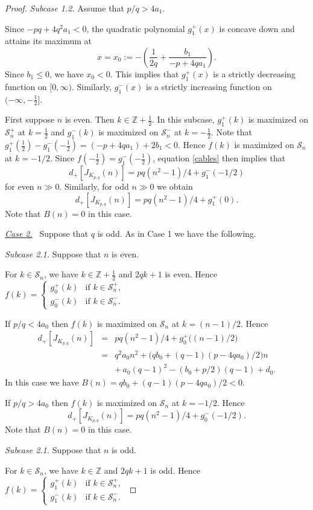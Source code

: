 \documentclass[11pt]{amsart}
\theoremstyle{definition}
\def\BZ{\mathbb Z}
\def\CS{\mathcal S}
\begin{document}
\begin{proof}
\textit{Subcase 1.2.} 
Assume that $p/q >4a_1$. 

Since $-pq + 4q^2 a_1<0$, the quadratic polynomial $g_1^+(x)$ is concave down and attains its maximum at 
$$x=x_0:=- \left(\frac{1}{2q}+\frac{b_1}{-p+4qa_1} \right).$$ Since $b_1 \le 0$, we have $x_0 < 0$. This implies that $g_1^+(x)$ is a strictly decreasing function on $[0,\infty)$. Similarly, $g_1^-(x)$ is a strictly increasing function on $(-\infty,-\frac{1}{2}]$.  

First suppose $n$ is even. Then $k \in \BZ+\frac{1}{2}$. In this subcase, $g_1^+(k)$ is maximized on $\CS^+_n$ at $k=\frac{1}{2}$ and $g_1^-(k)$ is maximized on $\CS^-_n$ at $k=-\frac{1}{2}$. Note that $g_1^+(\frac{1}{2})-g_1^-(-\frac{1}{2})=(-p+4qa_1)+2b_1<0$. Hence $f(k)$ is maximized on $\CS_n$ at $k=-1/2$. Since $f(-\frac{1}{2})=g_1^-(-\frac{1}{2})$, equation \eqref{cables} then implies that
$$d_+[J_{K_{p,q}}(n)]=pq(n^2-1)/4+g^-_1(-1/2)$$
for even $n \gg 0$. Similarly, for odd $n \gg 0$ we obtain
$$d_+[J_{K_{p,q}}(n)]=pq(n^2-1)/4+g^+_1(0).$$
Note that $B(n) = 0$ in this case.
\vskip 0.2in


\underline{\textit{Case 2.}} \ Suppose that $q$ is odd. 
As in Case 1 we have the following.
\vskip 0.1in

\textit{Subcase 2.1.}  Suppose that $n$ is even. 

For $k \in \CS_n$, we have $k \in \BZ+\frac{1}{2}$ and $2qk+1$ is even. Hence $f(k)= \begin{cases} g_0^+(k) &\mbox{if } k \in \CS^+_n, \\
g_0^-(k) &\mbox{if } k \in \CS^-_n.  \end{cases}$

If $p/q <4a_0$ then $f(k)$ is maximized on $\CS_n$ at $k=(n-1)/2$. Hence
\begin{eqnarray*}
d_+[J_{K_{p,q}}(n)] &=& pq(n^2-1)/4+g_0^+ \big( (n-1)/2 \big)\\
&=& q^2a_0n^2+ \big(qb_0+(q-1)(p-4qa_0)/2 \big)n\\
&& + \, a_0(q-1)^2-(b_0+p/2)(q-1)+d_0.
\end{eqnarray*}
In this case we have $B(n) = qb_0+(q-1)(p-4qa_0)/2<0$.

If $p/q >4a_0$ then $f(k)$ is maximized on $\CS_n$ at $k=-1/2$. Hence $$d_+[J_{K_{p,q}}(n)]=pq(n^2-1)/4+g^-_0(-1/2).$$
Note that $B(n) = 0$ in this case.

\vskip 0.1in

\textit{Subcase 2.1.}  Suppose that $n$ is odd. 

For $k \in \CS_n$, we have $k \in \BZ$ and $2qk+1$ is odd. Hence $f(k)= \begin{cases} g_1^+(k) &\mbox{if } k \in \CS^+_n, \\
g_1^-(k) &\mbox{if } k \in \CS^-_n.  \end{cases}$


\end{proof}
\end{document}
